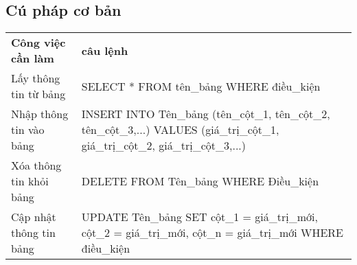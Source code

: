 \subsection{Cú pháp cơ bản}
\begin{center}

	\begin{tabularx}{\linewidth}{|l|X|}
		\cline{1-2}
		\textbf{Công việc cần làm} & \textbf{câu lệnh}                                                                                                                   \\ \cline{1-2}
		Lấy thông tin từ bảng      & SELECT * FROM tên\_bảng WHERE điều\_kiện                                                                                            \\ \cline{1-2}
		Nhập thông tin vào bảng    & INSERT INTO Tên\_bảng (tên\_cột\_1, tên\_cột\_2, tên\_cột\_3,...) VALUES (giá\_trị\_cột\_1, giá\_trị\_cột\_2, giá\_trị\_cột\_3,...) \\ \cline{1-2}
		Xóa thông tin khỏi bảng    & DELETE FROM Tên\_bảng WHERE Điều\_kiện                                                                                              \\ \cline{1-2}
		Cập nhật thông tin bảng    & UPDATE Tên\_bảng SET cột\_1 = giá\_trị\_mới, cột\_2 = giá\_trị\_mới, cột\_n = giá\_trị\_mới WHERE điều\_kiện                        \\ \cline{1-2}
	\end{tabularx}
\end{center}
